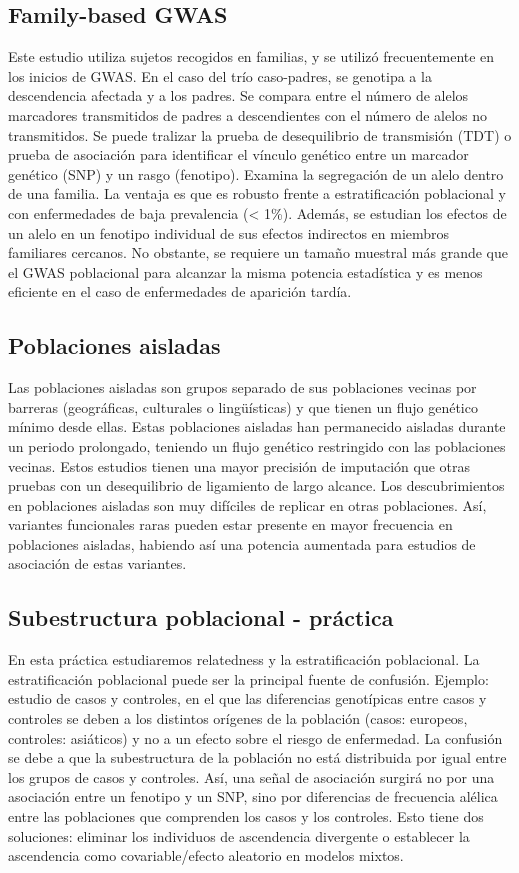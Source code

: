 \subsection{Family-based GWAS}
Este estudio utiliza sujetos recogidos en familias, y se utilizó frecuentemente en los inicios de GWAS. En el caso del trío caso-padres, se genotipa a la descendencia afectada y a los padres. Se compara entre el número de alelos marcadores transmitidos de padres a descendientes con el número de alelos no transmitidos. Se puede tralizar la prueba de desequilibrio de transmisión (TDT) o prueba de asociación para identificar el vínculo genético entre un marcador genético (SNP) y un rasgo (fenotipo). Examina la segregación de un alelo dentro de una familia. La ventaja es que es robusto frente a estratificación poblacional y con enfermedades de baja prevalencia (< 1\%). Además, se estudian los efectos de un alelo en un fenotipo individual de sus efectos indirectos en miembros familiares cercanos. No obstante, se requiere un tamaño muestral más grande que el GWAS poblacional para alcanzar la misma potencia estadística y es menos eficiente en el caso de enfermedades de aparición tardía.

\subsection{Poblaciones aisladas}
Las poblaciones aisladas son grupos separado de sus poblaciones vecinas por barreras (geográficas, culturales o lingüísticas) y que tienen un flujo genético mínimo desde ellas. Estas poblaciones aisladas han permanecido aisladas durante un periodo prolongado, teniendo un flujo genético restringido con las poblaciones vecinas. Estos estudios tienen una mayor precisión de imputación que otras pruebas con un desequilibrio de ligamiento de largo alcance. 
Los descubrimientos en poblaciones aisladas son muy difíciles de replicar en otras poblaciones. Así, variantes funcionales raras pueden estar presente en mayor frecuencia en poblaciones aisladas, habiendo así una potencia aumentada para estudios de asociación de estas variantes.

\subsection{Subestructura poblacional - práctica}
En esta práctica estudiaremos relatedness y la estratificación poblacional. La estratificación poblacional puede ser la principal fuente de confusión. Ejemplo: estudio de casos y controles, en el que las diferencias genotípicas entre casos y controles se deben a los distintos orígenes de la población (casos: europeos, controles: asiáticos) y no a un efecto sobre el riesgo de enfermedad. La confusión se debe a que la subestructura de la población no está distribuida por igual entre los grupos de casos y controles. Así, una señal de asociación surgirá no por una asociación entre un fenotipo y un SNP, sino por diferencias de frecuencia alélica entre las poblaciones que comprenden los casos y los controles. Esto tiene dos soluciones: eliminar los individuos de ascendencia divergente o establecer la ascendencia como covariable/efecto aleatorio en modelos mixtos.

